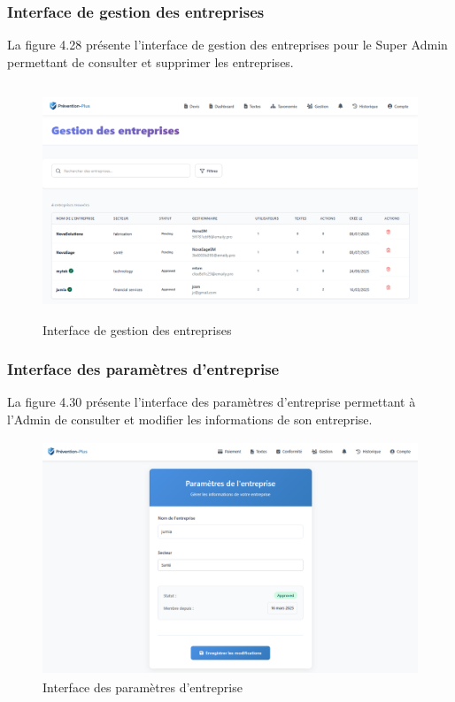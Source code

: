 \subsubsection{Interface de gestion des entreprises}
\noindent La figure 4.28 présente l'interface de gestion des entreprises pour le Super Admin permettant de consulter et supprimer les entreprises.

\begin{figure}[H]
    \centering
    \includegraphics[width=13cm,height=7cm]{images/gestionentreprises.PNG}
    \caption{Interface de gestion des entreprises}
\end{figure}


\subsubsection{Interface des paramètres d'entreprise}
\noindent La figure 4.30 présente l'interface des paramètres d'entreprise permettant à l'Admin de consulter et modifier les informations de son entreprise.

\begin{figure}[H]
    \centering
    \includegraphics[width=13cm,height=7cm]{images/parametresentreprise.PNG}
    \caption{Interface des paramètres d'entreprise}
\end{figure}

